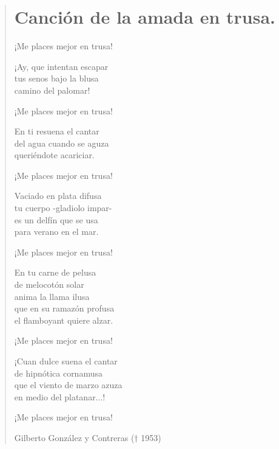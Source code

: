 \documentclass[12pt, twoside]{book}
\begin{document}
\begin{verse}
\begin{center}
\section{Canción de la amada en trusa.}
\end{center}

¡Me places mejor en trusa!\newline

¡Ay, que intentan escapar \\
tus senos bajo la blusa\\
camino del palomar!\newline

¡Me places mejor en trusa!\newline

En ti resuena el cantar\\
del agua cuando se aguza \\
queriéndote acariciar.\newline

¡Me places mejor en trusa!\newline

Vaciado en plata difusa\\
tu cuerpo -gladiolo impar-\\
es un delfín que se usa\\
para verano en el mar.\newline

¡Me places mejor en trusa!\newline

En tu carne de pelusa\\
de melocotón solar\\
anima la llama ilusa\\
que en su ramazón profusa\\
el flamboyant quiere alzar.\newline

¡Me places mejor en trusa!\newpage

¡Cuan dulce suena el cantar\\
de hipnótica cornamusa\\
que el viento de marzo azuza\\
en medio del platanar...!\newline

¡Me places mejor en trusa!\newline

Gilberto González y Contreras ($\dagger$ 1953)

\end{verse}
\newpage
\end{document}
